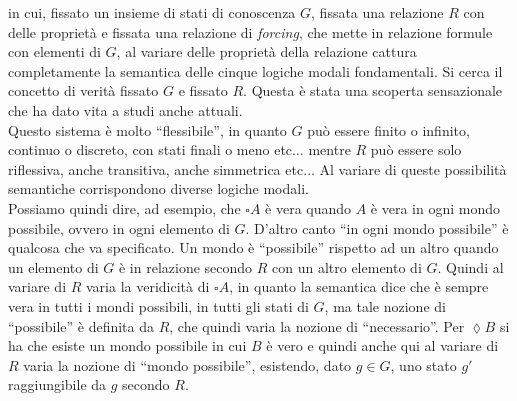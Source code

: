 \documentclass[a4paper,12pt, oneside]{book}
\begin{document}
in cui, fissato un insieme di stati di conoscenza $G$, fissata una relazione $R$
con delle proprietà e fissata una relazione di \textit{forcing}, che mette in
relazione formule con elementi di $G$, al variare delle proprietà della
relazione cattura completamente la semantica delle cinque logiche modali
fondamentali. Si cerca il concetto di verità fissato $G$ e fissato $R$. Questa è
stata una scoperta sensazionale che ha dato vita a studi anche attuali.\\
Questo sistema è molto ``flessibile'', in quanto $G$ può essere finito o
infinito, continuo o discreto, con stati finali o meno etc$\ldots$ mentre $R$
può essere solo riflessiva, anche transitiva, anche simmetrica etc$\ldots$ Al
variare di queste possibilità semantiche corrispondono diverse logiche modali.\\
Possiamo quindi dire, ad esempio, che $\square A$ è vera quando $A$ è vera in
ogni mondo possibile, ovvero in ogni elemento di $G$. D'altro canto ``in ogni
mondo possibile'' è qualcosa che va specificato. Un mondo è ``possibile''
rispetto ad un altro quando un elemento di $G$ è in relazione secondo $R$ con un
altro elemento di $G$. Quindi al variare di $R$ varia la veridicità di $\square
A$, in quanto la semantica dice che è sempre vera in tutti i mondi possibili, in
tutti gli stati di $G$, ma tale nozione di ``possibile'' è definita da $R$, che
quindi varia la nozione di ``necessario''. Per $\lozenge B$ si ha che esiste un
mondo possibile in cui $B$ è vero e quindi anche qui al variare di $R$ varia la
nozione di ``mondo possibile'', esistendo, dato $g\in G$, uno stato $g'$
raggiungibile da $g$ secondo $R$.
\end{document}
